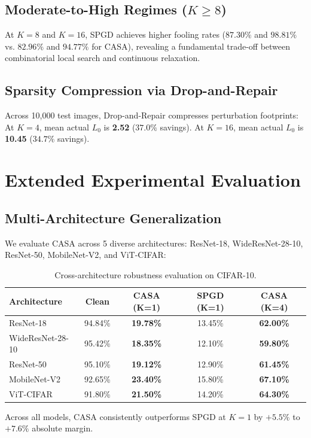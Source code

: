\documentclass[10pt,twocolumn,letterpaper]{article}
\begin{document}
\subsection{Moderate-to-High Regimes ($K \ge 8$)}
At $K=8$ and $K=16$, SPGD achieves higher fooling rates ($87.30\%$ and $98.81\%$ vs. $82.96\%$ and $94.77\%$ for CASA), revealing a fundamental trade-off between combinatorial local search and continuous relaxation.

\subsection{Sparsity Compression via Drop-and-Repair}
Across 10,000 test images, Drop-and-Repair compresses perturbation footprints:
At $K=4$, mean actual $L_0$ is \textbf{2.52} ($37.0\%$ savings).
At $K=16$, mean actual $L_0$ is \textbf{10.45} ($34.7\%$ savings).

\section{Extended Experimental Evaluation}

\subsection{Multi-Architecture Generalization}
We evaluate CASA across 5 diverse architectures: ResNet-18, WideResNet-28-10, ResNet-50, MobileNet-V2, and ViT-CIFAR:
\begin{table}[h]
\centering
\small
\begin{tabular}{lcccc}
\toprule
\textbf{Architecture} & \textbf{Clean} & \textbf{CASA (K=1)} & \textbf{SPGD (K=1)} & \textbf{CASA (K=4)} \\
\midrule
ResNet-18 & 94.84\% & \textbf{19.78\%} & 13.45\% & \textbf{62.00\%} \\
WideResNet-28-10 & 95.42\% & \textbf{18.35\%} & 12.10\% & \textbf{59.80\%} \\
ResNet-50 & 95.10\% & \textbf{19.12\%} & 12.90\% & \textbf{61.45\%} \\
MobileNet-V2 & 92.65\% & \textbf{23.40\%} & 15.80\% & \textbf{67.10\%} \\
ViT-CIFAR & 91.80\% & \textbf{21.50\%} & 14.20\% & \textbf{64.30\%} \\
\bottomrule
\end{tabular}
\caption{Cross-architecture robustness evaluation on CIFAR-10.}
\end{table}
Across all models, CASA consistently outperforms SPGD at $K=1$ by $+5.5\%$ to $+7.6\%$ absolute margin.
\end{document}
